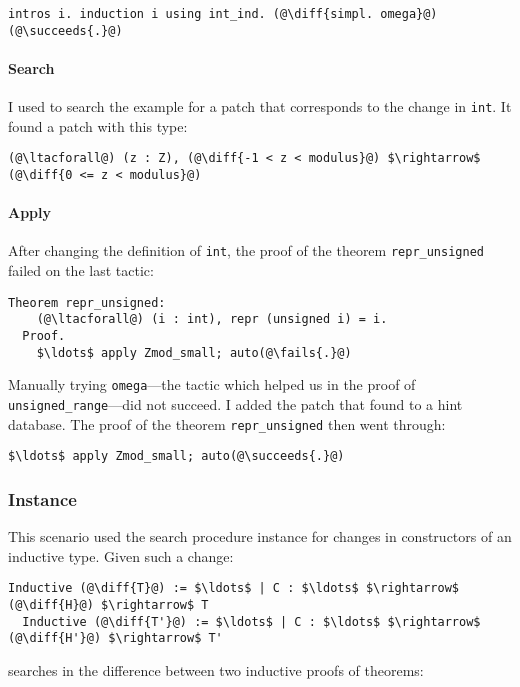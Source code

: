 \begin{lstlisting}[language=coq]
    intros i. induction i using int_ind. (@\diff{simpl. omega}@)(@\succeeds{.}@)
\end{lstlisting}

\paragraph{Search} I used \sysname to search the example for a patch that corresponds to the change in \lstinline{int}. It found
a patch with this type:

\begin{lstlisting}[language=coq]
   (@\ltacforall@) (z : Z), (@\diff{-1 < z < modulus}@) $\rightarrow$ (@\diff{0 <= z < modulus}@)
\end{lstlisting}

\paragraph{Apply} After changing the definition of \lstinline{int}, the proof of the
theorem \lstinline{repr_unsigned} failed on the last tactic:

\begin{lstlisting}[language=coq]
  Theorem repr_unsigned:
    (@\ltacforall@) (i : int), repr (unsigned i) = i.
  Proof.
    $\ldots$ apply Zmod_small; auto(@\fails{.}@)
\end{lstlisting}
Manually trying \lstinline{omega}---the tactic which helped us in the proof of \lstinline{unsigned_range}---did not
succeed.
I added the patch that \sysname found to a hint database.
The proof of the theorem \lstinline{repr_unsigned} then went through:

\begin{lstlisting}[language=coq]
  $\ldots$ apply Zmod_small; auto(@\succeeds{.}@)
\end{lstlisting}

\subsubsection*{Instance}

This scenario used the search procedure instance for changes in constructors of an inductive type.
Given such a change:

\begin{lstlisting}[language=coq]
  Inductive (@\diff{T}@) := $\ldots$ | C : $\ldots$ $\rightarrow$ (@\diff{H}@) $\rightarrow$ T
  Inductive (@\diff{T'}@) := $\ldots$ | C : $\ldots$ $\rightarrow$ (@\diff{H'}@) $\rightarrow$ T'
\end{lstlisting}
\sysname searches in the difference between two inductive proofs of theorems:

